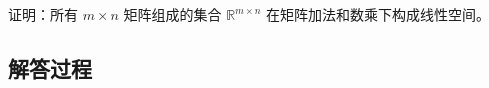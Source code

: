 \begin{example}[矩阵空间证明]
    证明：所有 \(m \times n\) 矩阵组成的集合 \(\mathbb{R}^{m \times n}\) 在矩阵加法和数乘下构成线性空间。
    \end{example}
    
    \subsection*{解答过程}
    